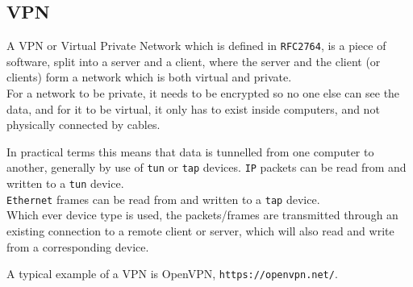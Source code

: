 \subsection{VPN}
A VPN or Virtual Private Network which is defined in \texttt{RFC2764}\cite{rfc2764}, is a piece of software, split into a server and a client, where the server and the client (or clients) form a network which is both virtual and private.\\
For a network to be private, it needs to be encrypted so no one else can see the data, and for it to be virtual, it only has to exist inside computers, and not physically connected by cables.\par In practical terms this means that data is tunnelled from one computer to another, generally by use of \texttt{tun} or \texttt{tap} devices.
\texttt{IP} packets can be read from and written to a \texttt{tun} device.\\
\texttt{Ethernet} frames can be read from and written to a \texttt{tap} device.\\
Which ever device type is used, the packets/frames are transmitted through an existing connection to a remote client or server, which will also read and write from a corresponding device.\par
A typical example of a VPN is OpenVPN, \texttt{https://openvpn.net/}.


